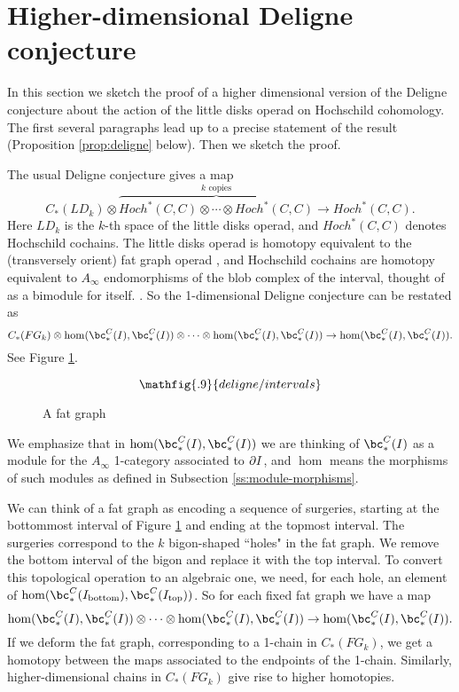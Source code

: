 
\section{Higher-dimensional Deligne conjecture}
\label{sec:deligne}
In this section we 
sketch
the proof of a higher dimensional version of the Deligne conjecture
about the action of the little disks operad on Hochschild cohomology.
The first several paragraphs lead up to a precise statement of the result
(Proposition \ref{prop:deligne} below).
Then we sketch the proof.

The usual Deligne conjecture  gives a map
\[
	C_*(LD_k)\otimes \overbrace{Hoch^*(C, C)\otimes\cdots\otimes Hoch^*(C, C)}^{\text{$k$ copies}}
			\to  Hoch^*(C, C) .
\]
Here $LD_k$ is the $k$-th space of the little disks operad, and $Hoch^*(C, C)$ denotes Hochschild
cochains.
The little disks operad is homotopy equivalent to the 
(transversely orient) fat graph operad
, 
and Hochschild cochains are homotopy equivalent to $A_\infty$ endomorphisms
of the blob complex of the interval, thought of as a bimodule for itself.
.
So the 1-dimensional Deligne conjecture can be restated as
\[
	C_*(FG_k)\otimes \hom(\bc^C_*(I), \bc^C_*(I))\otimes\cdots
	\otimes \hom(\bc^C_*(I), \bc^C_*(I))
	  \to  \hom(\bc^C_*(I), \bc^C_*(I)) .
\]
See Figure \ref{delfig1}.
\begin{figure}[!ht]
$$\mathfig{.9}{deligne/intervals}$$
\caption{A fat graph}\label{delfig1}\end{figure}
We emphasize that in $\hom(\bc^C_*(I), \bc^C_*(I))$ we are thinking of $\bc^C_*(I)$ as a module
for the $A_\infty$ 1-category associated to $\partial I$, and $\hom$ means the 
morphisms of such modules as defined in 
Subsection \ref{ss:module-morphisms}.

We can think of a fat graph as encoding a sequence of surgeries, starting at the bottommost interval
of Figure \ref{delfig1} and ending at the topmost interval.
The surgeries correspond to the $k$ bigon-shaped ``holes" in the fat graph.
We remove the bottom interval of the bigon and replace it with the top interval.
To convert this topological operation to an algebraic one, we need, for each hole, an element of
$\hom(\bc^C_*(I_{\text{bottom}}), \bc^C_*(I_{\text{top}}))$.
So for each fixed fat graph we have a map
\[
	 \hom(\bc^C_*(I), \bc^C_*(I))\otimes\cdots
	\otimes \hom(\bc^C_*(I), \bc^C_*(I))  \to  \hom(\bc^C_*(I), \bc^C_*(I)) .
\]
If we deform the fat graph, corresponding to a 1-chain in $C_*(FG_k)$, we get a homotopy
between the maps associated to the endpoints of the 1-chain.
Similarly, higher-dimensional chains in $C_*(FG_k)$ give rise to higher homotopies.

